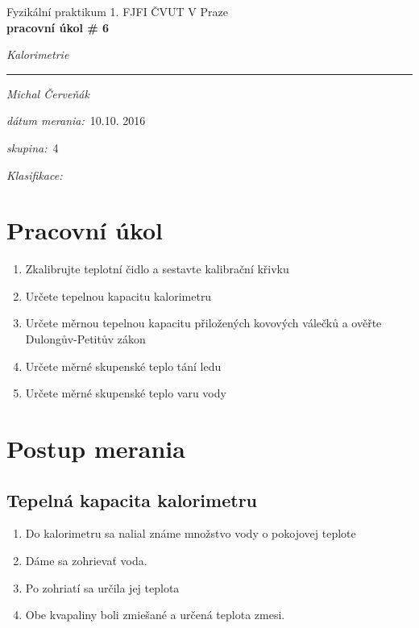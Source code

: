 \documentclass[a4paper,10pt]{article}
\begin{document}
\def\mean#1{\left< #1 \right>}
\noindent
{\large Fyzikální praktikum 1.} \hfil {\large FJFI ČVUT V Praze}\\
\noindent
{\large\textbf{pracovní úkol \# 6}}
\begin{center}
{\large\textit{Kalorimetrie}}
\end{center}
\noindent
\rule{\textwidth}{1px}
\vspace{\baselineskip}

\emph{Michal Červeňák}
\par
\vspace{\baselineskip}
\begin{minipage}[l]{0.5\textwidth}%
\textit{dátum merania:}~10.10. 2016\\%
\par%
\noindent%
\textit{skupina:}~4\\%
\par%
\noindent%
\textit{Klasifikace:}\dotfill\\%
\end{minipage}

\section{Pracovní úkol}
\begin{enumerate}
\item Zkalibrujte teplotní čidlo a sestavte kalibrační křivku
\item Určete tepelnou kapacitu kalorimetru
\item Určete měrnou tepelnou kapacitu přiložených kovových válečků a ověřte Dulongův-Petitův zákon
\item Určete měrné skupenské teplo tání ledu 
\item Určete měrné skupenské teplo varu vody
\end{enumerate}

\section{Postup merania}


\subsection{Tepelná kapacita kalorimetru}
\begin{enumerate}
\item Do kalorimetru sa nalial známe množstvo vody o pokojovej teplote
\item Dáme sa zohrievať voda.
\item Po zohriatí sa určila jej teplota
\item Obe kvapaliny boli zmiešané a určená teplota zmesi.
\end{enumerate}
\end{document}
